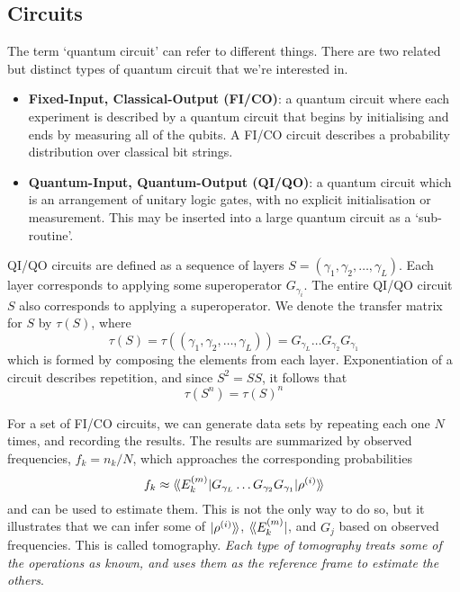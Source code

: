 \subsection{Circuits}

The term `quantum circuit' can refer to different things. There are two related but distinct types
of quantum circuit that we're interested in.
\begin{itemize}
    \item \textbf{Fixed-Input, Classical-Output (FI/CO)}: a quantum circuit where each experiment is
    described by a quantum circuit that begins by initialising and ends by measuring all of the
    qubits. A FI/CO circuit describes a probability distribution over classical bit strings.
    \item \textbf{Quantum-Input, Quantum-Output (QI/QO)}: a quantum circuit which is an arrangement
    of unitary logic gates, with no explicit initialisation or measurement. This may be inserted
    into a large quantum circuit as a `sub-routine'.
\end{itemize}

QI/QO circuits are defined as a sequence of layers $S = (\gamma_1, \gamma_2, \dots, \gamma_L)$. Each
layer corresponds to applying some superoperator $G_{\gamma_i}$. The entire QI/QO circuit $S$ also
corresponds to applying a superoperator. We denote the transfer matrix for $S$ by $\tau(S)$, where
\begin{equation}
    \tau(S) = \tau((\gamma_1, \gamma_2, \dots, \gamma_L)) = G_{\gamma_L} \dots G_{\gamma_2} G_{\gamma_1}
\end{equation}
which is formed by composing the elements from each layer. Exponentiation of a circuit describes
repetition, and since $S^2 = SS$, it follows that
\begin{equation}
    \tau(S^n) = \tau(S)^n
\end{equation}

For a set of FI/CO circuits, we can generate data sets by repeating each one $N$ times, and
recording the results. The results are summarized by observed frequencies, $f_k = n_k / N$, which
approaches the corresponding probabilities
\begin{equation} \label{eq:observed_freq}
    f_k \approx \langle\!\braket{E_k^{(m)} | G_{\gamma_L} \dots G_{\gamma_2} G_{\gamma_1} | \rho^{(i)}}\!\rangle
\end{equation}
and can be used to estimate them. This is not the only way to do so, but it illustrates that we can
infer some of $\ket{\rho^{(i)}}\!\rangle$, $\langle\!\bra{E_k^{(m)}}$, and $G_j$ based on observed
frequencies. This is called tomography. \textit{Each type of tomography treats some of the
operations as known, and uses them as the reference frame to estimate the others}.

